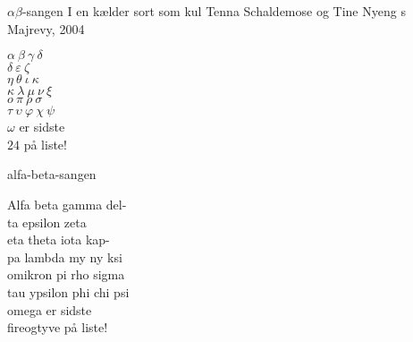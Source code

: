 \begin{song}{$\alpha\beta$-sangen}{}
  {I en kælder sort som kul}
  {Tenna Schaldemose og Tine Nyeng}
  {\TKET{}s Majrevy, 2004}
  {\NotCCLIed}

  \begin{SBVerse}
    $\alpha\ \beta\ \gamma\ \delta$\hspace{-2.5pt}\protect\colorbox{white}{\phantom{$\delta$}}\\
    \hspace{-2.5pt}$\delta$\hspace{-1.25em}\colorbox{white}{\phantom{$\delta$}}$\ \varepsilon\ \zeta$\\
    $\eta\ \theta\ \iota\ \kappa$\hspace{-2.5pt}\protect\colorbox{white}{\phantom{$\kappa$}}\\
    \hspace{-3pt}$\kappa$\hspace{-1.3em}\colorbox{white}{\phantom{$\kappa$}}$\ \lambda\ \mu\ \nu\ \xi$\\
    $o\ \pi\ \rho\ \sigma$\\
    $\tau\ \upsilon\ \varphi\ \chi\ \psi$\\
    $\omega$ er sidste\\
    $24$ på liste!
  \end{SBVerse}
\CBPageBrk
  \begin{xlatn}{alfa-beta-sangen}
    {}
    {}

    \begin{SBVerse}
      Alfa beta gamma del-\\
      ta epsilon zeta\\
      eta theta iota kap-\\
      pa lambda my ny ksi\\
      omikron pi rho sigma\\
      tau ypsilon phi chi psi\\
      omega er sidste\\
      fireogtyve på liste!
    \end{SBVerse}
  \end{xlatn}
\end{song}